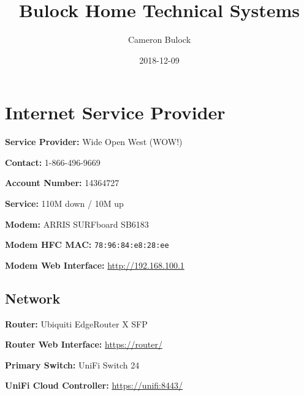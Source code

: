 \documentclass[]{article}
\date{2018-12-09}
\author{Cameron Bulock}
\begin{document}

\pretitle{\begin{center}\fontsize{30bp}{30bp}\selectfont}
\posttitle{\par\end{center}}
\title{\color{midgray}\textbf{Bulock Home Technical Systems}}

\maketitle

\tableofcontents



\newpage

\vspace{\baselineskip}\section*{Internet Service Provider}

\textbf{Service Provider: }
{Wide Open West (WOW!)}

\textbf{Contact: }
{1-866-496-9669}

\textbf{Account Number: }
{14364727}

\textbf{Service: }
{110M down / 10M up}

\textbf{Modem: }
{ARRIS SURFboard SB6183}

\textbf{Modem HFC MAC: }
\texttt{78:96:84:e8:28:ee}

\textbf{Modem Web Interface: }
{\href{https://www.google.com/url?q=http://192.168.100.1\&sa=D\&ust=1544293199830000}{http://192.168.100.1}}


\subsection{\texorpdfstring{{Network}}{Network}}

\textbf{Router: }
{Ubiquiti EdgeRouter X SFP}

\textbf{Router Web Interface: }
{\href{https://www.google.com/url?q=https://router/\&sa=D\&ust=1544293199833000}{https://router/}}

\textbf{Primary Switch: }
{UniFi Switch 24}

\textbf{UniFi Cloud Controller: }
{\href{https://www.google.com/url?q=https://unifi:8443/\&sa=D\&ust=1544293199834000}{https://unifi:8443/}}
\end{document}
